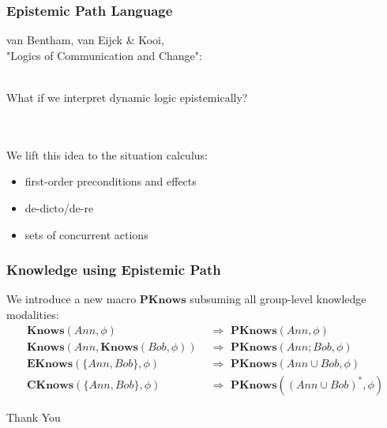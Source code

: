 \documentclass[compress]{beamer}
\newcommand{\EKnows}{\mathbf{EKnows}}
\newcommand{\Knows}{\mathbf{Knows}}
\newcommand{\CKnows}{\mathbf{CKnows}}
\newcommand{\PKnows}{\mathbf{PKnows}}
\begin{document}
\begin{frame}
\frametitle{Epistemic Path Language}
van Bentham, van Eijck \& Kooi,\\
"Logics of Communication and Change":
\ \\
\ \\
\begin{centering}
What if we interpret dynamic logic epistemically?
\end{centering}
\ \\
\ \\
We lift this idea to the situation calculus:
\begin{itemize}
\item first-order preconditions and effects
\item de-dicto/de-re
\item sets of concurrent actions
\end{itemize}
\end{frame}

\begin{frame}
\frametitle{Knowledge using Epistemic Path}
We introduce a new macro $\PKnows$ subsuming all group-level knowledge modalities:
\begin{alignat*}
\Knows(Ann,\phi) & \,\,\Rightarrow\,\,\PKnows(Ann,\phi) \\
\Knows(Ann,\Knows(Bob,\phi)) & \,\,\Rightarrow\,\,\PKnows(Ann ; Bob,\phi) \\
\EKnows(\{Ann,Bob\},\phi) & \,\,\Rightarrow\,\,\PKnows(Ann \cup Bob,\phi) \\
\CKnows(\{Ann,Bob\},\phi) & \,\,\Rightarrow\,\,\PKnows((Ann \cup Bob)^*,\phi)
\end{alignat*}
\end{frame}


\begin{frame}
\centering \large Thank You\\
\end{frame}
\end{document}
